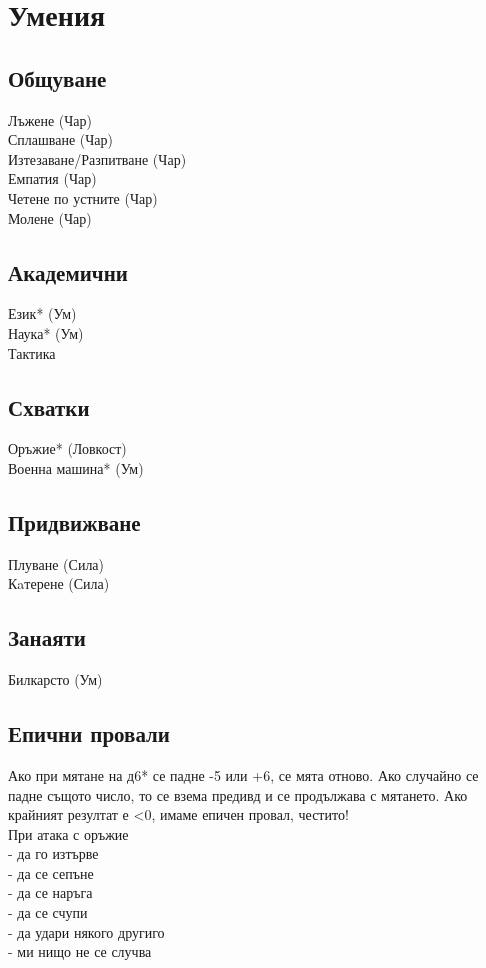 
\section{Умения}
\subsection{Общуване}
Лъжене (Чар)                      \\
Сплашване (Чар)                   \\
Изтезаване/Разпитване (Чар)       \\
Емпатия (Чар)                     \\
Четене по устните (Чар)           \\
Молене (Чар)                      \\

\subsection{Академични}
Език* (Ум)                        \\
Наука* (Ум)                       \\
Тактика

\subsection{Схватки}
Оръжие* (Ловкост)                 \\
Военна машина* (Ум)               \\

\subsection{Придвижване}
Плуване (Сила)                    \\
Кaтерене (Сила)                   \\

\subsection{Занаяти}
Билкарсто (Ум)                    \\

\subsection{Епични провали}
Ако при мятане на д6* се падне -5 или +6, се мята отново.
Ако случайно се падне същото число, то се взема предивд и се продължава с мятането.
Ако крайният резултат е <0, имаме епичен провал, честито!  \\ 

При атака с оръжие           \\
- да го изтърве              \\
- да се сепъне               \\
- да се наръга               \\
- да се счупи                \\
- да удари някого другиго    \\
- ми нищо не се случва       \\
